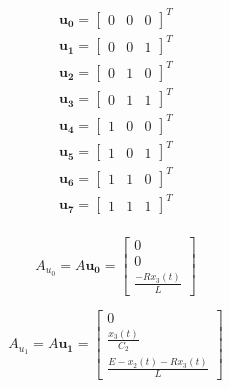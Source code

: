 \begin{equation}
	\begin{split}
		\mathbf{u_0} = 
		\left[
			\begin{array}{ccc}
				0 & 0 & 0
			\end{array}
		\right]^T \\
		\mathbf{u_1} = 
		\left[
			\begin{array}{ccc}
				0 & 0 & 1
			\end{array}
		\right]^T \\
		\mathbf{u_2} = 
		\left[
			\begin{array}{ccc}
				0 & 1 & 0
			\end{array}
		\right]^T \\
		\mathbf{u_3} = 
		\left[
			\begin{array}{ccc}
				0 & 1 & 1
			\end{array}
		\right]^T \\
		\mathbf{u_4} = 
		\left[
			\begin{array}{ccc}
				1 & 0 & 0
			\end{array}
		\right]^T \\
		\mathbf{u_5} = 
		\left[
			\begin{array}{ccc}
				1 & 0 & 1
			\end{array}
		\right]^T \\
		\mathbf{u_6} = 
		\left[
			\begin{array}{ccc}
				1 & 1 & 0
			\end{array}
		\right]^T \\
		\mathbf{u_7} = 
		\left[
			\begin{array}{ccc}
				1 & 1 & 1
			\end{array}
		\right]^T \\
	\end{split}
\end{equation}


\begin{equation}
	A_{u_0}=A \mathbf{u_0}=
	\left[
		\begin{array}{c}
			0 \\
			0 \\
			\frac{-R x_3(t)}{L}
		\end{array}
	\right]
\end{equation}

\begin{equation}
	A_{u_1}=A \mathbf{u_1}=
	\left[
		\begin{array}{c}
			0 \\
			\frac{x_3(t)}{C_2} \\
			\frac{E-x_2(t)-R x_3(t)}{L}
		\end{array}
	\right]
\end{equation}

